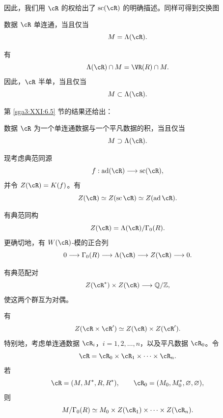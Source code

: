 因此，我们用 \(\cR\) 的权给出了 \(\operatorname{sc}(\cR)\) 的明确描述。同样可得到交换图
\begin{center}
\end{center}

\begin{corollary}\label{sga3:XXI:6.6.7}
数据 \(\cR\) 单连通，当且仅当
\[
 M=\Lambda(\cR).
\]
\end{corollary}

\begin{remark}\label{sga3:XXI:6.6.8}
有
\[
 \Lambda(\cR)\cap M=\VR(R)\cap M.
\]
因此，\(\cR\) 半单，当且仅当
\[
 M\subset\Lambda(\cR).
\]
\end{remark}

第 \ref{sga3:XXI:6.5} 节的结果还给出：

\begin{corollary}\label{sga3:XXI:6.6.9}
数据 \(\cR\) 为一个单连通数据与一个平凡数据的积，当且仅当
\[
 M\supset\Lambda(\cR).
\]
\end{corollary}

现考虑典范同源
\[
 f:\operatorname{ad}(\cR)\longrightarrow\operatorname{sc}(\cR),
\]
并令 \(Z(\cR)=K(f)\)。有
\[
 Z(\cR)\simeq Z(\operatorname{sc}\cR)
 \simeq Z(\operatorname{ad}\cR).
\]

\begin{corollary}\label{sga3:XXI:6.6.10}
有典范同构
\[
 Z(\cR)=\Lambda(\cR)/\Gamma_0(R).
\]
更确切地，有 \(W(\cR)\)-模的正合列
\[
 0\longrightarrow\Gamma_0(R)\longrightarrow\Lambda(\cR)
 \longrightarrow Z(\cR)\longrightarrow0.
\]
\end{corollary}

\begin{corollary}\label{sga3:XXI:6.6.11}
有典范配对
\[
 Z(\cR^\ast)\times Z(\cR)\longrightarrow\mathbb Q/\mathbb Z,
\]
使这两个群互为对偶。
\end{corollary}

\begin{remark}\label{sga3:XXI:6.6.12}
有
\[
 Z(\cR\times\cR')\simeq Z(\cR)\times Z(\cR').
\]
特别地，考虑单连通数据 \(\cR_i\)，\(i=1,2,\ldots,n\)，以及平凡数据 \(\cR_0\)。令
\[
 \cR=\cR_0\times\cR_1\times\cdots\times\cR_n.
\]
若
\[
 \cR=(M,M^\ast,R,R^\ast),
 \qquad
 \cR_0=(M_0,M_0^\ast,\varnothing,\varnothing),
\]
则
\[
 M/\Gamma_0(R)\simeq
 M_0\times Z(\cR_1)\times\cdots\times Z(\cR_n).
\]
\end{remark}

